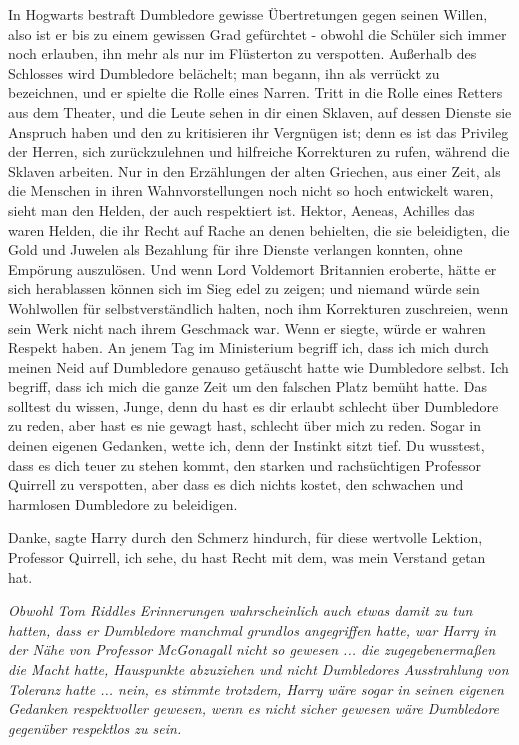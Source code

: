 \glqq{}In Hogwarts bestraft Dumbledore gewisse Übertretungen gegen seinen Willen,
also ist er bis zu einem gewissen Grad gefürchtet - obwohl die Schüler sich
immer noch erlauben, ihn mehr als nur im Flüsterton zu verspotten. Außerhalb des
Schlosses wird Dumbledore belächelt; man begann, ihn als verrückt zu bezeichnen,
und er spielte die Rolle eines Narren. Tritt in die Rolle eines Retters aus dem
Theater, und die Leute sehen in dir einen Sklaven, auf dessen Dienste sie
Anspruch haben und den zu kritisieren ihr Vergnügen ist; denn es ist das
Privileg der Herren, sich zurückzulehnen und hilfreiche Korrekturen zu rufen,
während die Sklaven arbeiten. Nur in den Erzählungen der alten Griechen, aus
einer Zeit, als die Menschen in ihren Wahnvorstellungen noch nicht so hoch
entwickelt waren, sieht man den Helden, der auch respektiert ist. Hektor,
Aeneas, Achilles das waren Helden, die ihr Recht auf Rache an denen behielten,
die sie beleidigten, die Gold und Juwelen als Bezahlung für ihre Dienste
verlangen konnten, ohne Empörung auszulösen. Und wenn Lord Voldemort Britannien
eroberte, hätte er sich herablassen können sich im Sieg edel zu zeigen; und
niemand würde sein Wohlwollen für selbstverständlich halten, noch ihm
Korrekturen zuschreien, wenn sein Werk nicht nach ihrem Geschmack war. Wenn er
siegte, würde er wahren Respekt haben. An jenem Tag im Ministerium begriff ich,
dass ich mich durch meinen Neid auf Dumbledore genauso getäuscht hatte wie
Dumbledore selbst. Ich begriff, dass ich mich die ganze Zeit um den falschen
Platz bemüht hatte. Das solltest du wissen, Junge, denn du hast es dir erlaubt
schlecht über Dumbledore zu reden, aber hast es nie gewagt hast, schlecht über
mich zu reden. Sogar in deinen eigenen Gedanken, wette ich, denn der Instinkt
sitzt tief. Du wusstest, dass es dich teuer zu stehen kommt, den starken und
rachsüchtigen Professor Quirrell zu verspotten, aber dass es dich nichts kostet,
den schwachen und harmlosen Dumbledore zu beleidigen.\grqq{}

\glqq{}Danke\grqq{}, sagte Harry durch den Schmerz hindurch, \glqq{}für diese
wertvolle Lektion, Professor Quirrell, ich sehe, du hast Recht mit dem, was mein
Verstand getan hat.\grqq{}

\emph{Obwohl Tom Riddles Erinnerungen wahrscheinlich auch etwas damit zu tun
hatten, dass er Dumbledore manchmal grundlos angegriffen hatte, war Harry in der
Nähe von Professor McGonagall nicht so gewesen ... die zugegebenermaßen die Macht
hatte, Hauspunkte abzuziehen und nicht Dumbledores Ausstrahlung von Toleranz
hatte ... nein, es stimmte trotzdem, Harry wäre sogar in seinen eigenen Gedanken
respektvoller gewesen, wenn es nicht sicher gewesen wäre Dumbledore gegenüber
respektlos zu sein.}

